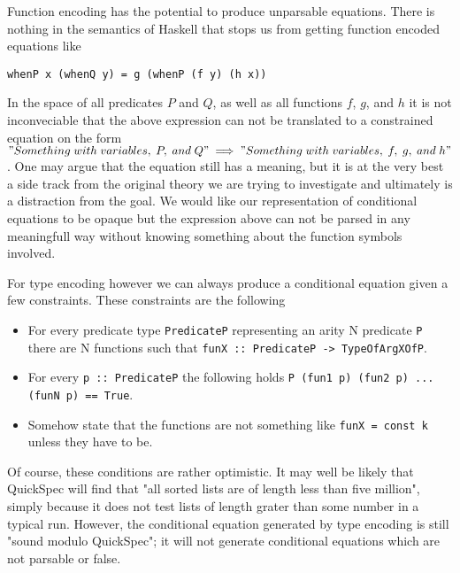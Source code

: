 Function encoding has the potential to produce unparsable equations.
There is nothing in the semantics of Haskell that stops us from getting function
encoded equations like
\begin{verbatim}whenP x (whenQ y) = g (whenP (f y) (h x))\end{verbatim}
In the space of all predicates $P$ and $Q$, as well as all functions $f$, $g$, and $h$ it
is not inconveciable that the above expression can not be translated to a constrained
equation on the form\\$"Something\;with\;variables,\;P,\;and\;Q"\implies "Something\;with\;variables,\;f,\;g,\;and\;h"$.
One may argue that the equation still has a meaning, but it is at the very best a side track
from the original theory we are trying to investigate and ultimately is a distraction from the goal.
We would like our representation of conditional equations to be opaque but the expression above
can not be parsed in any meaningfull way without knowing something about the function symbols involved.

For type encoding however we can always produce a conditional equation given a few constraints.
These constraints are the following
\begin{itemize}
    \item For every predicate type \texttt{PredicateP} representing an arity N predicate \texttt{P}
        there are N functions such that \texttt{funX :: PredicateP -> TypeOfArgXOfP}.
    \item For every \texttt{p :: PredicateP} the following holds \texttt{P (fun1 p) (fun2 p) ... (funN p) == True}.
    \item Somehow state that the functions are not something like \texttt{funX = const k} unless they have to be.
\end{itemize}
Of course, these conditions are rather optimistic. It may well be likely that QuickSpec will find that "all sorted lists
are of length less than five million", simply because it does not test lists of length grater than some number in a typical
run. However, the conditional equation generated by type encoding is still "sound modulo QuickSpec"; it will not generate
conditional equations which are not parsable or false.
